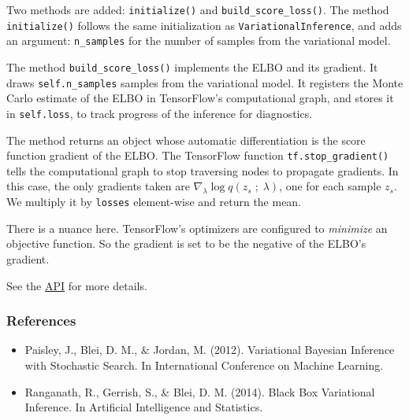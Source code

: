 Two methods are added: \texttt{initialize()} and
\texttt{build_score_loss()}.  The method \texttt{initialize()} follows
the same initialization as \texttt{VariationalInference}, and adds an
argument: \texttt{n_samples} for the number of samples from the
variational model.

The method \texttt{build_score_loss()} implements the ELBO and its
gradient. It draws \texttt{self.n_samples} samples from the
variational model. It registers the Monte Carlo
estimate of the ELBO in TensorFlow's computational graph, and stores it
in \texttt{self.loss}, to track progress of the inference for diagnostics.

The method returns an object whose automatic differentiation is the
score function gradient of the ELBO. The TensorFlow function
\texttt{tf.stop_gradient()} tells the computational graph to stop
traversing nodes to propagate gradients. In this case,
the only gradients taken are $\nabla_\lambda \log q(z_s\;;\;\lambda)$,
one for each sample $z_s$. We multiply it by \texttt{losses}
element-wise and return the mean.

There is a nuance here. TensorFlow's optimizers are configured to
\emph{minimize} an objective function. So the gradient is set to be
the negative of the ELBO's gradient.

See the \href{api/index.html}{API} for more details.

\subsubsection{References}\label{references}

\begin{itemize}
\item
  Paisley, J., Blei, D. M., & Jordan, M. (2012). Variational Bayesian
  Inference with Stochastic Search. In International Conference on
  Machine Learning.
\item
  Ranganath, R., Gerrish, S., & Blei, D. M. (2014). Black Box
  Variational Inference. In Artificial Intelligence and Statistics.
\end{itemize}
